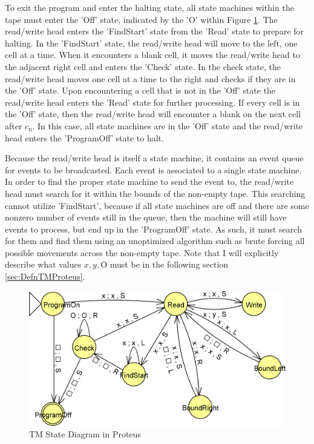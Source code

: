 To exit the program and enter the halting state, all state machines within the tape must enter the 'Off' state, indicated by the 'O' within Figure \ref{fig:ProteusStateTM}.
The read/write head enters the 'FindStart' state from the 'Read' state to prepare for halting.
In the 'FindStart' state, the read/write head will move to the left, one cell at a time.
When it encounters a blank cell, it moves the read/write head to the adjacent right cell and enters the 'Check' state.
In the check state, the read/write head moves one cell at a time to the right and checks if they are in the 'Off' state.
Upon encountering a cell that is not in the 'Off' state the read/write head enters the 'Read' state for further processing.
If every cell is in the 'Off' state, then the read/write head will encounter a blank on the next cell after $c_{\text{n}}$.
In this case, all state machines are in the 'Off' state and the read/write head enters the 'ProgramOff' state to halt.

Because the read/write head is itself a state machine, it contains an event queue for events to be broadcasted.
Each event is associated to a single state machine.
In order to find the proper state machine to send the event to, the read/write head must search for it within the bounds of the non-empty tape.
This searching cannot utilize 'FindStart', because if all state machines are off and there are some nonzero number of events still in the queue, then the machine will still have events to process, but end up in the 'ProgramOff' state.
As such, it must search for them and find them using an unoptimized algorithm such as brute forcing all possible movements across the non-empty tape.
Note that I will explicitly describe what values $x, y, \text{O}$ must be in the following section \ref{sec:DefnTMProteus}.

\begin{figure}[h!]
    \centering
    \includegraphics[width=16cm]{images/ProteusTM.png}
       \caption{TM State Diagram in Proteus}
           \label{fig:ProteusStateTM}
\end{figure}

